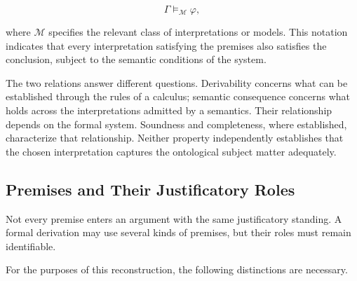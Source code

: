 \[
    \Gamma \models_{\mathcal{M}} \varphi,
\]

where \(\mathcal{M}\) specifies the relevant class of interpretations
or models. This notation indicates that every interpretation
satisfying the premises also satisfies the conclusion, subject to
the semantic conditions of the system.

The two relations answer different questions. Derivability concerns
what can be established through the rules of a calculus; semantic
consequence concerns what holds across the interpretations admitted
by a semantics. Their relationship depends on the formal system.
Soundness and completeness, where established, characterize that
relationship. Neither property independently establishes that the
chosen interpretation captures the ontological subject matter
adequately.

\subsection{Premises and Their Justificatory Roles}

Not every premise enters an argument with the same justificatory
standing. A formal derivation may use several kinds of premises, but
their roles must remain identifiable.

For the purposes of this reconstruction, the following distinctions
are necessary.

